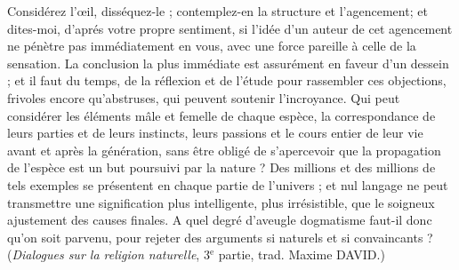 Considérez l’{\oe}il, disséquez-le ; contemplez-en la structure
et l'agencement; et dites-moi, d’aprés votre propre
sentiment, si l'idée d’un auteur de cet agencement ne
pénètre pas immédiatement en vous, avec une force
pareille à celle de la sensation. La conclusion la plus immédiate
est assurément en faveur d’un dessein ; et il faut du
temps, de la réflexion et de l’étude pour rassembler ces
objections, frivoles encore qu’abstruses, qui peuvent
soutenir l'incroyance. Qui peut considérer les éléments
mâle et femelle de chaque espèce, la correspondance de
leurs parties et de leurs instincts, leurs passions et le
cours entier de leur vie avant et après la génération,
sans être obligé de s’apercevoir que la propagation de
l'espèce est un but poursuivi par la nature ? Des millions
et des millions de tels exemples se présentent en chaque
partie de l'univers ; et nul langage ne peut transmettre
une signification plus intelligente, plus irrésistible, que
le soigneux ajustement des causes finales. A quel degré
d’aveugle dogmatisme faut-il donc qu’on soit parvenu,
pour rejeter des arguments si naturels et si convaincants ?
({\it Dialogues sur la religion naturelle}, 3$^\text{e}$ partie, trad. Maxime
D{\footnotesize AVID}.)
